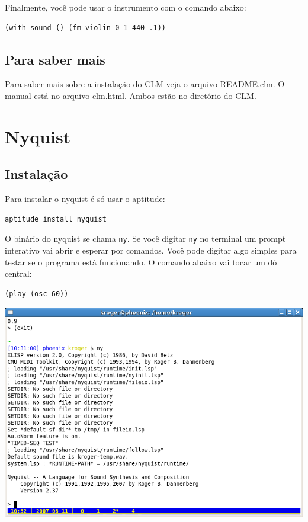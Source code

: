 \documentclass[12pt,brazil]{book}
\begin{document}
Finalmente, você pode usar o instrumento com o comando abaixo:

\begin{verbatim}
(with-sound () (fm-violin 0 1 440 .1)) 
\end{verbatim}

\section{Para saber mais}
\label{sec:para-saber-mais}

Para saber mais sobre a instalação do CLM veja o arquivo README.clm.
O manual está no arquivo clm.html. Ambos estão no diretório do CLM.

\chapter{Nyquist}
\label{cha:nyquist}

\section{Instalação}
\label{sec:instalacao-1}

Para instalar o nyquist é só usar o aptitude:

\begin{verbatim}
aptitude install nyquist
\end{verbatim}

O binário do nyquist se chama \texttt{ny}. Se você digitar \texttt{ny}
no terminal um prompt interativo vai abrir e esperar por comandos.
Você pode digitar algo simples para testar se o programa está
funcionando. O comando abaixo vai tocar um dó central:

\begin{verbatim}
(play (osc 60))
\end{verbatim}

\begin{htmlonly}
  \includegraphics{ny1}
\end{htmlonly}
\end{document}
